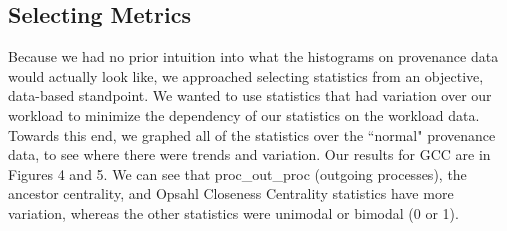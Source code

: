 \documentclass[10pt,twocolumn]{article}
\begin{document}
\subsection{Selecting Metrics}
Because we had no prior intuition into what the histograms on provenance data would actually look like, we approached selecting statistics from an objective, data-based standpoint. We wanted to use statistics that had variation over our workload to minimize the dependency of our statistics on the workload data. Towards this end, we graphed all of the statistics over the ``normal" provenance data, to see where there were trends and variation. Our results for GCC are in Figures 4 and 5. We can see that proc\_out\_proc (outgoing processes), the ancestor centrality, and Opsahl Closeness Centrality statistics have more variation, whereas the other statistics were unimodal or bimodal (0 or 1). 
\end{document}
